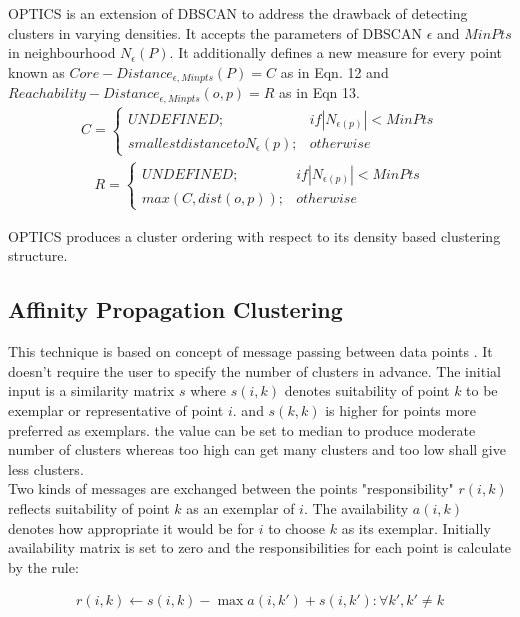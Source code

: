 OPTICS is an extension of DBSCAN to address the drawback of detecting clusters in varying densities. It accepts the parameters of DBSCAN $\epsilon$ and $MinPts$ in neighbourhood $N_{\epsilon}(P)$. It additionally defines a new measure for every point known as $Core-Distance_{\epsilon, Minpts}(P) = C$ as in Eqn. 12 and $Reachability-Distance_{\epsilon, Minpts}(o,p) = R$ as in Eqn 13.\\

\begin{align}
C = \begin{cases}UNDEFINED; & if | N_{\epsilon(p)} | < MinPts\\smallest distance to N_{\epsilon}(p); & otherwise\end{cases}
\end{align}
\begin{align}
R = \begin{cases}UNDEFINED; & if |N_{\epsilon(p)}| < MinPts\\max(C, dist(o,p)); & otherwise\end{cases}
\end{align}

OPTICS produces a cluster ordering with respect to its density based clustering structure. 

\subsection{Affinity Propagation Clustering}

This technique is based on concept of message passing between data points \cite{aps:47}. It doesn't require the user to specify the number of clusters in advance. The initial input is a similarity matrix $s$ where $s(i,k)$ denotes suitability of point $k$ to be exemplar or representative of point $i$. and $s(k,k)$ is higher for points more preferred as exemplars. the value can be set to median to produce moderate number of clusters whereas too high can get many clusters and too low shall give less clusters.\\

Two kinds of messages are exchanged between the points "responsibility" $r(i,k)$ reflects suitability of point $k$ as an exemplar of $i$. The availability $a(i,k)$ denotes how appropriate it would be for $i$ to choose $k$ as its exemplar. Initially availability matrix is set to zero and the responsibilities for each point is calculate by the rule:

\begin{align}
r(i,k) \leftarrow s(i,k) - \max {a(i,k')+s(i,k')} : \forall k', k' \neq k
\end{align}

